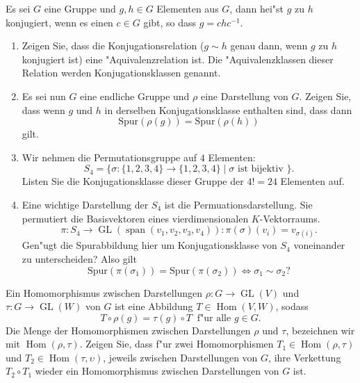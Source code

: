 \documentclass[a4,11pt]{article}
\begin{document}
\begin{aufgabe}[4 Punkte]
Es sei $G$ eine Gruppe und $g,h \in G$ Elementen aus $G$, dann hei"st $g$ zu $h$ konjugiert, wenn es einen $c \in G$ gibt, so dass $g = chc^{-1}$.\begin{enumerate}
\item
Zeigen Sie, dass die Konjugationsrelation ($g \sim h$ genau dann, wenn $g$ zu $h$ konjugiert ist) eine "Aquivalenzrelation ist. Die "Aquivalenzklassen dieser Relation werden Konjugationsklassen genannt.
\item
Es sei nun $G$ eine endliche Gruppe und $\rho$ eine Darstellung von $G$. Zeigen Sie, dass wenn $g$ und $h$ in derselben Konjugationsklasse enthalten sind, dass dann
\[
\text{Spur}(\rho(g)) = \text{Spur}(\rho(h)) 
\]
gilt.
\item
Wir nehmen die Permutationsgruppe auf $4$ Elementen:
\[
S_4 = \{ \sigma : \{ 1,2,3,4 \} \to \{ 1,2,3,4 \} \mid \sigma \text{ ist bijektiv } \}.
\]
Listen Sie die Konjugationsklasse dieser Gruppe der $4! = 24$ Elementen auf.
\item
Eine wichtige Darstellung der $S_4$ ist die Permuationsdarstellung. Sie permutiert die Basisvektoren eines vierdimensionalen $K$-Vektorraums.
\[
\pi : S_4 \to \operatorname{GL}(\operatorname{span}(v_1, v_2, v_3, v_4)) : \pi(\sigma)(v_i) = v_{\sigma(i)}.
\]
Gen"ugt die Spurabbildung hier um Konjugationsklasse von $S_4$ voneinander zu unterscheiden? Also gilt
\[
\text{Spur}(\pi(\sigma_1)) = \text{Spur}(\pi(\sigma_2)) \Leftrightarrow \sigma_1 \sim \sigma_2 ?
\]
\end{enumerate}

\end{aufgabe}

\begin{aufgabe}[4 Punkte]
Ein Homomorphismus zwischen Darstellungen $\rho : G \to \operatorname{GL}(V)$ und $\tau : G \to \operatorname{GL}(W)$ von $G$ ist eine Abbildung $T \in \operatorname{Hom}(V,W)$, sodass
\[
T \circ \rho(g) = \tau(g) \circ T \ \text{ f"ur alle } g \in G.
\]
Die Menge der Homomorphismen zwischen Darstellungen $\rho$ und $\tau$, bezeichnen wir mit $\operatorname{Hom}(\rho, \tau)$.
Zeigen Sie, dass f"ur zwei Homomorphismen $T_1 \in \operatorname{Hom}(\rho, \tau)$ und $T_2 \in \operatorname{Hom}(\tau, \upsilon)$, jeweils zwischen Darstellungen von $G$, ihre Verkettung $T_2 \circ T_1$ wieder ein Homomorphismus zwischen Darstellungen von $G$ ist.
\end{aufgabe}
\end{document}
